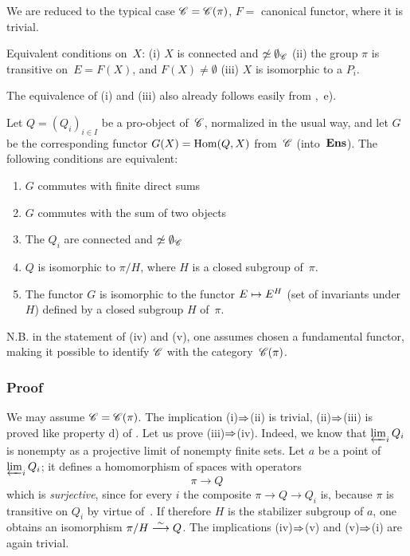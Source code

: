 We are reduced to the typical case $\cal{C}=\cal{C}(\pi)$, $F=$ canonical
functor, where it is trivial.

\begin{corollary}
\label{V.5.4}
Equivalent conditions on~$X$: \textup{(i)} $X$ is connected and
$\not\simeq\emptyset_{\cal{C}}$ \textup{(ii)} the group $\pi$ is
transitive on~$E=F(X)$, and $F(X)\ne\emptyset$ \textup{(iii)} $X$ is
isomorphic to a $P_i$.
\end{corollary}

The equivalence
of (i) and (iii) also already follows easily from
\No {},~e).

\begin{proposition}
\label{V.5.5}
Let $Q=(Q_i)_{i\in I}$ be a pro-object
of~$\cal{C}$,
normalized in the usual way, and let $G$ be the
corresponding functor $G(X)=\operatorname{Hom}(Q, X)$ from~$\cal{C}$
(into~$\mathbf{Ens}$).
The following conditions are equivalent:
\begin{enumerate}
\item[(i)] $G$ commutes with finite direct sums
\item[(ii)] $G$ commutes with the sum of two objects
\item[(iii)] The $Q_i$ are connected and
$\not\simeq\emptyset_\cal{C}$
\item[(iv)] $Q$ is isomorphic to $\pi/H$, where $H$ is a
closed subgroup of~$\pi$.
\item[(v)] The functor $G$ is isomorphic to the functor $E\mto
E^H$ (set of invariants under $H$) defined by a closed
subgroup $H$ of~$\pi$.
\end{enumerate}
\end{proposition}

N.B. in the statement of (iv) and (v), one assumes chosen a
fundamental functor, making it possible to identify $\cal{C}$ with the
category~$\cal{C}(\pi)$.

\subsubsection*{Proof} We may assume
$\cal{C}=\cal{C}(\pi)$. The implication (i)$\To$(ii) is
trivial, (ii)$\To$(iii) is proved like
property d) of \No {}. Let us prove (iii)$\To$(iv). Indeed,
we know that $\varprojlim_i Q_i$ is nonempty as a projective
limit of nonempty finite sets. Let $a$ be a point of
$\varprojlim_i Q_i$; it defines a homomorphism of spaces with
operators
$$
\pi\to Q
$$
which is \emph{surjective}, since for every $i$ the composite $\pi\to
Q\to Q_i$ is, because $\pi$ is transitive on $Q_i$ by virtue
of~. If therefore $H$ is the stabilizer subgroup of
$a$, one obtains an isomorphism $\pi/H\overset{\sim}{\longrightarrow} Q$. The implications
(iv)$\To$(v) and (v)$\To$(i) are again
trivial.

